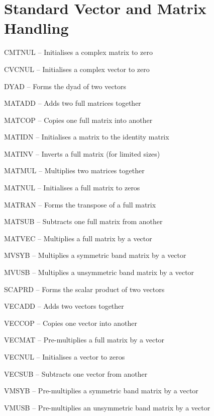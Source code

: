 \section{Standard Vector and Matrix Handling}
\begin{list}{}{\leftmargin=57pt }
\item[CMTNUL \hfill] -- Initialises a complex matrix to zero
\item[CVCNUL \hfill] -- Initialises a complex vector to zero
\item[DYAD \hfill]   -- Forms the dyad of two vectors
\item[MATADD \hfil]  -- Adds two full matrices together
\item[MATCOP \hfill] -- Copies one full matrix into another
\item[MATIDN \hfill] -- Initialises a matrix to the identity matrix
\item[MATINV \hfill] -- Inverts a full matrix (for limited sizes)
\item[MATMUL \hfill] -- Multiplies two matrices together
\item[MATNUL \hfill] -- Initialises a full matrix to zeros
\item[MATRAN \hfill] -- Forms the transpose of a full matrix
\item[MATSUB \hfill] -- Subtracts one full matrix from another
\item[MATVEC \hfill] -- Multiplies a full matrix by a vector
\item[MVSYB \hfill]  -- Multiplies a symmetric band matrix by a vector
\item[MVUSB \hfill]  -- Multiplies a unsymmetric band matrix by a vector
\item[SCAPRD \hfill] -- Forms the scalar product of two vectors
\item[VECADD \hfill] -- Adds two vectors together
\item[VECCOP \hfill] -- Copies one vector into another
\item[VECMAT \hfill] -- Pre-multiplies a full matrix by a vector
\item[VECNUL \hfill] -- Initialises a vector to zeros
\item[VECSUB \hfill] -- Subtracts one vector from another
\item[VMSYB \hfill]  -- Pre-multiplies a symmetric band matrix by a vector
\item[VMUSB \hfill]  -- Pre-multiplies an unsymmetric band matrix by a vector
\end{list}
